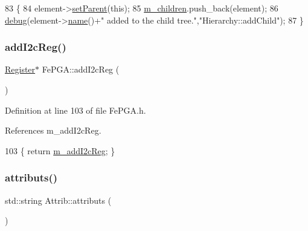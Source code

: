 \begin{DoxyCode}
83                                           \{
84   element->\hyperlink{classHierarchy_a585ad1aeec16077a0e532ab8b4fc557b}{setParent}(\textcolor{keyword}{this});
85   \hyperlink{classHierarchy_a038816763941fd4a930504917f60483b}{m\_children}.push\_back(element);
86   \hyperlink{classObject_aac010553f022165573714b7014a15f0d}{debug}(element->\hyperlink{classObject_a300f4c05dd468c7bb8b3c968868443c1}{name}()+\textcolor{stringliteral}{" added to the child tree."},\textcolor{stringliteral}{"Hierarchy::addChild"});
87 \}
\end{DoxyCode}
\mbox{\label{classFePGA_a64feabdb09e65b1b4b1376a4da713570}} 
\subsubsection{\texorpdfstring{add\+I2c\+Reg()}{addI2cReg()}}
{\footnotesize\ttfamily \hyperlink{classRegister}{Register}$\ast$ Fe\+P\+G\+A\+::add\+I2c\+Reg (\begin{DoxyParamCaption}{ }\end{DoxyParamCaption})\hspace{0.3cm}{\ttfamily [inline]}}



Definition at line 103 of file Fe\+P\+G\+A.\+h.



References m\+\_\+add\+I2c\+Reg.


\begin{DoxyCode}
103 \{ \textcolor{keywordflow}{return} \hyperlink{classFePGA_af3ef3467ba803e6d3b970ea8982d6246}{m\_addI2cReg};    \}
\end{DoxyCode}
\mbox{\label{classAttrib_aee7bbf16b144887f196e1341b24f8a26}} 
\subsubsection{\texorpdfstring{attributs()}{attributs()}}
{\footnotesize\ttfamily std\+::string Attrib\+::attributs (\begin{DoxyParamCaption}{ }\end{DoxyParamCaption})\hspace{0.3cm}{\ttfamily [inherited]}}

